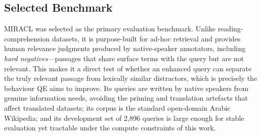 \begin{table}[H]
    \centering
    \caption[Arabic retrieval and QA datasets surveyed]{Arabic retrieval and QA datasets surveyed for benchmark selection. ``Suitability'' refers to fitness for studying QE for retrieval.}
    \label{tab:datasets_surveyed}
    \small
    \setlength{\tabcolsep}{4pt}
\end{table}

\subsection{Selected Benchmark}
MIRACL \cite{zhang_2023_miracl} was selected as the primary evaluation benchmark. Unlike reading-comprehension datasets, it is purpose-built for ad-hoc retrieval and provides human relevance judgments produced by native-speaker annotators, including \emph{hard negatives}---passages that share surface terms with the query but are not relevant. This makes it a direct test of whether an enhanced query can separate the truly relevant passage from lexically similar distractors, which is precisely the behaviour QE aims to improve. Its queries are written by native speakers from genuine information needs, avoiding the priming and translation artefacts that affect translated datasets; its corpus is the standard open-domain Arabic Wikipedia; and its development set of 2{,}896 queries is large enough for stable evaluation yet tractable under the compute constraints of this work.

